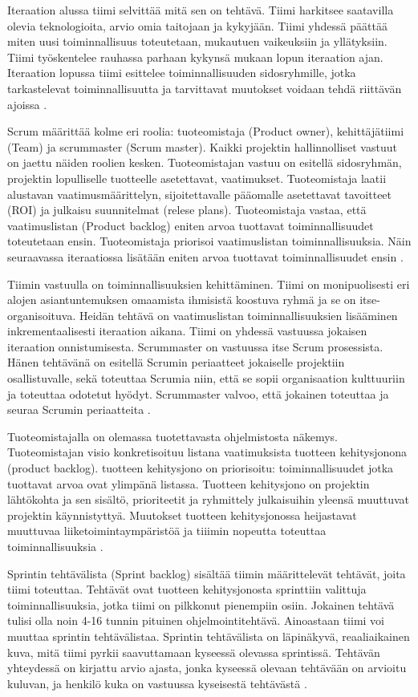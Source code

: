 \documentclass[finnish]{tktltiki2}
\theoremstyle{definition}
\theoremstyle{remark}
\begin{document}
Iteraation alussa tiimi selvittää mitä sen on tehtävä. Tiimi harkitsee saatavilla olevia teknologioita, arvio omia taitojaan ja kykyjään. Tiimi yhdessä päättää miten uusi toiminnallisuus toteutetaan, mukautuen vaikeuksiin ja yllätyksiin. Tiimi työskentelee rauhassa parhaan kykynsä mukaan lopun iteraation ajan. Iteraation lopussa tiimi esittelee toiminnallisuuden sidosryhmille, jotka tarkastelevat toiminnallisuutta ja tarvittavat muutokset voidaan tehdä riittävän ajoissa \cite{SCH09}.

Scrum määrittää kolme eri roolia: tuoteomistaja (Product owner), kehittäjätiimi (Team) ja scrummaster (Scrum master). Kaikki projektin hallinnolliset vastuut on jaettu näiden roolien kesken. Tuoteomistajan vastuu on esitellä sidosryhmän, projektin lopulliselle tuotteelle asetettavat, vaatimukset. Tuoteomistaja laatii alustavan vaatimusmäärittelyn, sijoitettavalle pääomalle asetettavat tavoitteet (ROI) ja julkaisu suunnitelmat (relese plans). Tuoteomistaja vastaa, että vaatimuslistan (Product backlog) eniten arvoa tuottavat toiminnallisuudet toteutetaan ensin. Tuoteomistaja priorisoi vaatimuslistan toiminnallisuuksia. Näin seuraavassa iteraatiossa lisätään eniten arvoa tuottavat toiminnallisuudet ensin \cite{SCH09}. 

Tiimin vastuulla on toiminnallisuuksien kehittäminen. Tiimi on monipuolisesti eri alojen asiantuntemuksen omaamista ihmisistä koostuva ryhmä ja se on itse-organisoituva. Heidän tehtävä on vaatimuslistan toiminnallisuuksien lisääminen inkrementaalisesti iteraation aikana. Tiimi on yhdessä vastuussa jokaisen iteraation onnistumisesta. Scrummaster on vastuussa itse Scrum prosessista. Hänen tehtävänä on esitellä Scrumin periaatteet jokaiselle projektiin osallistuvalle, sekä toteuttaa Scrumia niin, että se sopii organisaation kulttuuriin ja toteuttaa odotetut hyödyt. Scrummaster valvoo, että jokainen toteuttaa ja seuraa Scrumin periaatteita \cite{SCH09}.

Tuoteomistajalla on olemassa tuotettavasta ohjelmistosta näkemys. Tuoteomistajan visio konkretisoituu listana vaatimuksista tuotteen kehitysjonona (product backlog). tuotteen kehitysjono on priorisoitu: toiminnallisuudet jotka tuottavat arvoa ovat ylimpänä listassa. Tuotteen kehitysjono on projektin lähtökohta ja sen sisältö, prioriteetit ja ryhmittely julkaisuihin yleensä muuttuvat projektin käynnistyttyä. Muutokset tuotteen kehitysjonossa heijastavat muuttuvaa liiketoimintaympäristöä ja tiiimin nopeutta toteuttaa toiminnallisuuksia \cite{SCH09}.

Sprintin tehtävälista (Sprint backlog) sisältää tiimin määrittelevät tehtävät, joita tiimi toteuttaa. Tehtävät ovat tuotteen kehitysjonosta sprinttiin valittuja toiminnallisuuksia, jotka tiimi on pilkkonut pienempiin osiin. Jokainen tehtävä tulisi olla noin 4-16 tunnin pituinen ohjelmointitehtävä. Ainoastaan tiimi voi muuttaa sprintin tehtävälistaa. Sprintin tehtävälista on läpinäkyvä, reaaliaikainen kuva, mitä tiimi pyrkii saavuttamaan kyseessä olevassa sprintissä. Tehtävän yhteydessä on kirjattu arvio ajasta, jonka kyseessä olevaan tehtävään on arvioitu kuluvan, ja henkilö kuka on vastuussa kyseisestä tehtävästä \cite{SCH09}.
\end{document}
